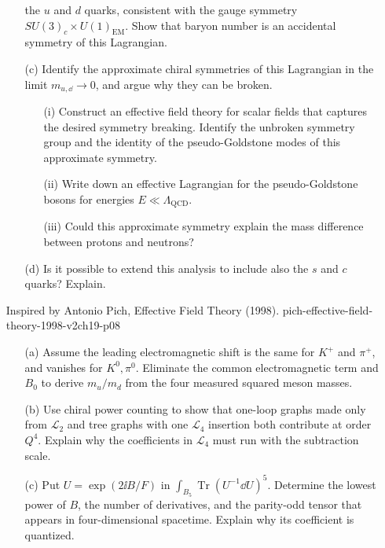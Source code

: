 \begin{enumerate}
\begin{enumerate}
    the \(u\) and \(d\) quarks, consistent with the gauge symmetry
    \(SU(3)_c\times U(1)_{\mathrm{EM}}\). Show that baryon number is an
    accidental symmetry of this Lagrangian.
    \item[(c)]
    Identify the approximate chiral symmetries of this Lagrangian in the
    limit \(m_{u,\dd}\to0\), and argue why they can be broken.
    \begin{enumerate}
      \item[(i)]
      Construct an effective field theory for scalar fields that captures
      the desired symmetry breaking. Identify the unbroken symmetry group
      and the identity of the pseudo-Goldstone modes of this approximate
      symmetry.
      \item[(ii)]
      Write down an effective Lagrangian for the pseudo-Goldstone bosons for
      energies \(E\ll\Lambda_{\mathrm{QCD}}\).
      \item[(iii)]
      Could this approximate symmetry explain the mass difference between
      protons and neutrons?
    \end{enumerate}
    \item[(d)]
    Is it possible to extend this analysis to include also the \(s\) and
    \(c\) quarks? Explain.
  \end{enumerate}

  {Inspired by Antonio Pich, Effective Field Theory (1998).}
  {pich-effective-field-theory-1998-v2ch19-p08}
  \begin{enumerate}
    \item[(a)]
    Assume the leading electromagnetic shift is the same for
    \(K^+\) and \(\pi^+\), and vanishes for \(K^0,\pi^0\).
    Eliminate the common electromagnetic term and \(B_0\) to derive
    \(m_u/m_d\) from the four measured squared meson masses.
    \item[(b)]
    Use chiral power counting to show that one-loop graphs made only from
    \(\mathcal L_2\) and tree graphs with one \(\mathcal L_4\) insertion
    both contribute at order \(Q^4\).  Explain why the coefficients in
    \(\mathcal L_4\) must run with the subtraction scale.
    \item[(c)]
    Put \(U=\exp(2\ii B/F)\) in
    \(\int_{B_5}\operatorname{Tr}(U^{-1}\dd U)^5\).
    Determine the lowest power of \(B\), the number of derivatives, and the
    parity-odd tensor that appears in four-dimensional spacetime.  Explain
    why its coefficient is quantized.
  \end{enumerate}


\end{enumerate}
